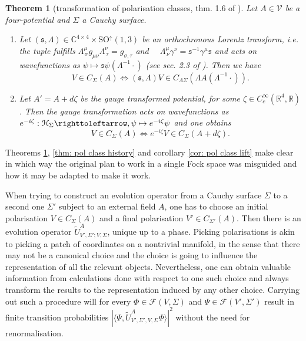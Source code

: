 \documentclass[b5paper,draft,openbib,12pt]{memoir}
\newtheorem{Thm}[Def]{Theorem}
\begin{document}
\begin{Thm}[transformation of polarisation classes, thm. 1.6 of \cite{ivp2}]\label{thm: pol class transform}
Let \(A\in\mathcal{V}\) be a four-potential and \(\Sigma\) 
a Cauchy surface.

\begin{enumerate}[label=\alph*)]
\item Let \((\mathfrak{s},\Lambda)\in \mathbb{C}^{4\times 4}\times \mathrm{SO}^{\uparrow}(1,3)\)
be an orthochronous Lorentz transform, i.e. the tuple fulfills
\(\Lambda^{\mu}_{\, \sigma}g_{\mu \nu}\Lambda^\nu_{\, \tau}=g_{\sigma, \tau}\) 
and \(\quad \Lambda^\mu_{\, \nu}\gamma^\nu = \mathfrak{s}^{-1} \gamma^\mu \mathfrak{s}\) 
and acts on wavefunctions as \(\psi\mapsto \mathfrak{s}\psi(\Lambda^{-1}\cdot)\) (see sec. 2.3 of \cite{ivp1}). 
Then we have
\begin{equation}
V\in C_{\Sigma}(A) \iff (\mathfrak{s},\Lambda)V \in C_{\Lambda \Sigma}(\Lambda A (\Lambda^{-1}\cdot)).
\end{equation}
\item Let \(A'=A+d\zeta\) be the gauge transformed potential, 
for some \(\zeta \in C_c^\infty(\mathbb{R}^4,\mathbb{R})\). Then
the gauge transformation acts on wavefunctions as 
\(e^{-i\zeta}:\mathcal{H}_{\Sigma}\righttoleftarrow,\psi\mapsto e^{-i\zeta}\psi\)
and one obtains 
\begin{equation}
V\in C_{\Sigma}(A) \iff e^{-i\zeta}V \in C_{\Sigma}(A+d\zeta).
\end{equation}
\end{enumerate}
\end{Thm}

Theorems \ref{thm: pol class transform}, \ref{thm: pol class history}
and corollary \ref{cor: pol class lift} make clear in which way
the original plan to work in a single Fock space was misguided and 
how it may be adapted to make it work.

When trying to construct an evolution operator from a Cauchy surface \(\Sigma\)
to a second one \(\Sigma'\) subject to an external field \(A\),
one has to choose an initial polarisation \(V\in C_{\Sigma}(A)\)
and a final polarisation \(V'\in C_{\Sigma'}(A)\). 
Then there is an evolution operator 
\(\tilde{U}^A_{V',\Sigma';V,\Sigma}\), unique up to a phase. 
Picking polarisations is akin to picking a patch 
of coordinates on a 
nontrivial manifold, in the sense that there may not be a 
canonical choice and the choice is going to influence the 
representation of all the relevant objects. Nevertheless,
one can obtain valuable information from calculations done 
with respect to one such choice and always transform the 
results to the representation induced by any other choice. 
Carrying out such a procedure will  for every 
\(\Phi\in \mathcal{F}(V,\Sigma)\) and 
\(\Psi\in \mathcal{F}(V',\Sigma')\) result in finite 
transition probabilities
\(|\langle \Psi, \tilde{U}^A_{V',\Sigma',V,\Sigma} \Phi\rangle |^2\)
without the need for renormalisation. 
\end{document}
